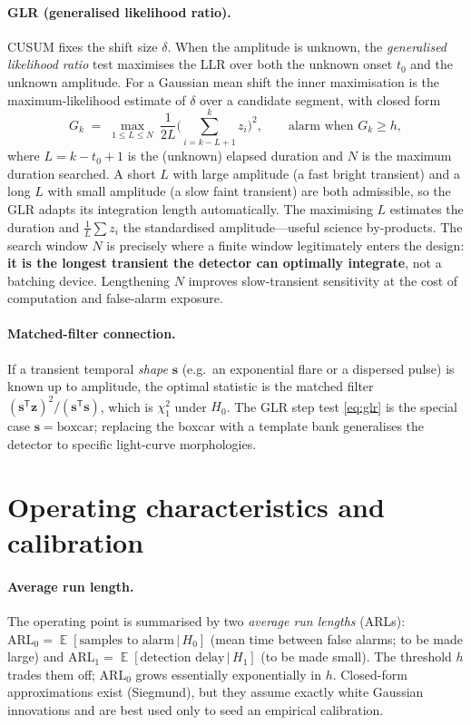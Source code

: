 \documentclass[11pt]{article}
\DeclareMathOperator{\E}{\mathbb{E}}
\newcommand{\T}{^{\mathsf{T}}}
\newcommand{\given}{\,|\,}
\begin{document}
\paragraph{GLR (generalised likelihood ratio).}
CUSUM fixes the shift size $\delta$. When the amplitude is unknown, the
\emph{generalised likelihood ratio} test maximises the LLR over both the unknown onset
$t_0$ and the unknown amplitude. For a Gaussian mean shift the inner maximisation is
the maximum-likelihood estimate of $\delta$ over a candidate segment, with closed form
\begin{equation}
  G_k \;=\; \max_{1\le L\le N}\ \frac{1}{2L}\Bigg(\sum_{i=k-L+1}^{k} z_i\Bigg)^{\!2},
  \qquad\text{alarm when } G_k\ge h,
  \label{eq:glr}
\end{equation}
where $L=k-t_0+1$ is the (unknown) elapsed duration and $N$ is the maximum duration
searched. A short $L$ with large amplitude (a fast bright transient) and a long $L$
with small amplitude (a slow faint transient) are both admissible, so the GLR adapts
its integration length automatically. The maximising $L$ estimates the duration and
$\tfrac1L\sum z_i$ the standardised amplitude---useful science by-products. The
search window $N$ is precisely where a finite window legitimately enters the design:
\textbf{it is the longest transient the detector can optimally integrate}, not a
batching device. Lengthening $N$ improves slow-transient sensitivity at the cost of
computation and false-alarm exposure.

\paragraph{Matched-filter connection.}
If a transient temporal \emph{shape} $\bm{s}$ (e.g.\ an exponential flare or a
dispersed pulse) is known up to amplitude, the optimal statistic is the matched filter
$(\bm{s}\T\bm{z})^2/(\bm{s}\T\bm{s})$, which is $\chi^2_1$ under $H_0$. The GLR step
test \eqref{eq:glr} is the special case $\bm{s}=\text{boxcar}$; replacing the boxcar
with a template bank generalises the detector to specific light-curve morphologies.

\section{Operating characteristics and calibration}
\label{sec:arl}

\paragraph{Average run length.}
The operating point is summarised by two \emph{average run lengths} (ARLs):
$\mathrm{ARL}_0=\E[\text{samples to alarm}\given H_0]$ (mean time between false alarms;
to be made large) and $\mathrm{ARL}_1=\E[\text{detection delay}\given H_1]$ (to be made
small). The threshold $h$ trades them off; $\mathrm{ARL}_0$ grows essentially
exponentially in $h$. Closed-form approximations exist (Siegmund), but they assume
exactly white Gaussian innovations and are best used only to seed an empirical
calibration.
\end{document}
